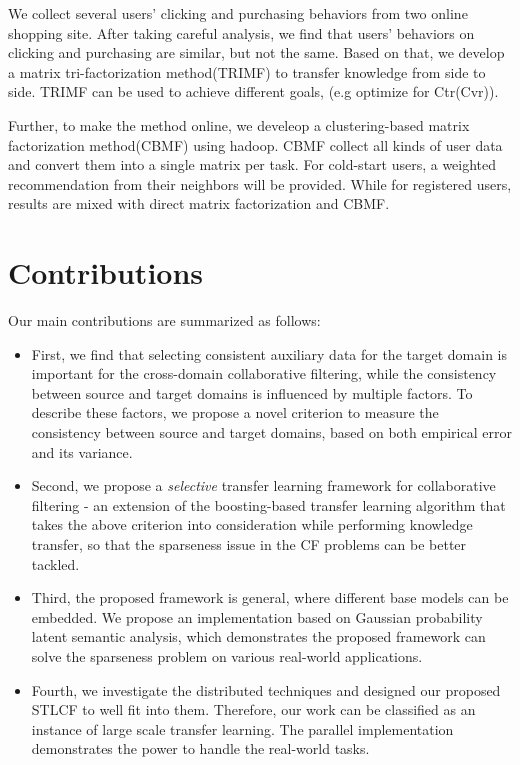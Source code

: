We collect several users' clicking and purchasing behaviors from two online shopping site. After taking careful analysis, we find that users' behaviors on clicking and purchasing are similar, but not the same. Based on that, we develop a matrix tri-factorization method(TRIMF) to transfer knowledge from side to side. TRIMF can be used to achieve different goals, (e.g optimize for Ctr(Cvr)).

Further, to make the method online, we develeop a clustering-based matrix factorization method(CBMF) using hadoop. CBMF collect all kinds of user data and convert them into a single matrix per task. For cold-start users, a weighted recommendation from their neighbors will be provided. While for registered users, results are mixed with direct matrix factorization and CBMF.

\hspace{0.1in}
\section{Contributions}

Our main contributions are summarized as follows:

\begin{itemize}[noitemsep,topsep=0pt,parsep=0pt,partopsep=0pt]
\item First, we find that selecting consistent auxiliary data for the target domain is important for the cross-domain collaborative filtering, while the consistency between source and target domains is influenced by multiple factors. To describe these factors, we propose a novel  criterion to measure the consistency between source and target domains, based on both empirical error and its variance.
\item Second, we propose a {\em selective} transfer learning framework for collaborative filtering - an extension of the boosting-based transfer learning algorithm that takes the above criterion into consideration while performing knowledge transfer, so that the sparseness issue in the CF problems can be better tackled.
\item Third, the proposed framework is general, where different base models can be embedded. We propose an implementation based on Gaussian probability latent semantic analysis, which demonstrates the proposed framework can solve the sparseness problem on various real-world applications.
\item Fourth, we investigate the distributed techniques and designed our proposed STLCF to well fit into them. Therefore, our work can be classified as an instance of large scale transfer learning. The parallel implementation demonstrates the power to handle the real-world tasks.
\end{itemize}

